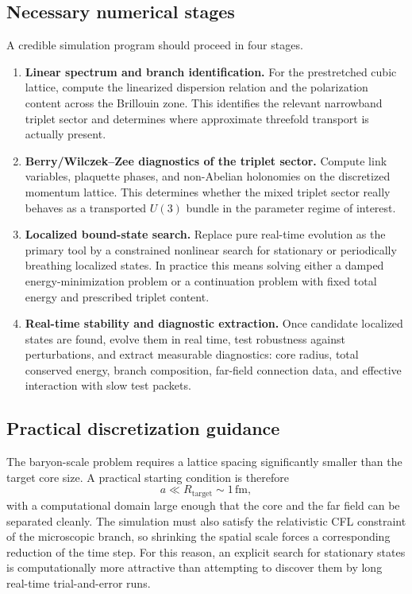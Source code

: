 \subsection{Necessary numerical stages}

A credible simulation program should proceed in four stages.
\begin{enumerate}
\item \textbf{Linear spectrum and branch identification.}
For the prestretched cubic lattice, compute the linearized dispersion relation and the polarization content across the Brillouin zone.
This identifies the relevant narrowband triplet sector and determines where approximate threefold transport is actually present.

\item \textbf{Berry/Wilczek--Zee diagnostics of the triplet sector.}
Compute link variables, plaquette phases, and non-Abelian holonomies on the discretized momentum lattice.
This determines whether the mixed triplet sector really behaves as a transported $U(3)$ bundle in the parameter regime of interest.

\item \textbf{Localized bound-state search.}
Replace pure real-time evolution as the primary tool by a constrained nonlinear search for stationary or periodically breathing localized states.
In practice this means solving either a damped energy-minimization problem or a continuation problem with fixed total energy and prescribed triplet content.

\item \textbf{Real-time stability and diagnostic extraction.}
Once candidate localized states are found, evolve them in real time, test robustness against perturbations, and extract measurable diagnostics:
core radius, total conserved energy, branch composition, far-field connection data, and effective interaction with slow test packets.
\end{enumerate}

\subsection{Practical discretization guidance}

The baryon-scale problem requires a lattice spacing significantly smaller than the target core size.
A practical starting condition is therefore
\begin{equation}
  a \ll R_{\mathrm{target}} \sim 1\,\mathrm{fm},
\end{equation}
with a computational domain large enough that the core and the far field can be separated cleanly.
The simulation must also satisfy the relativistic CFL constraint of the microscopic branch, so shrinking the spatial scale forces a corresponding reduction of the time step.
For this reason, an explicit search for stationary states is computationally more attractive than attempting to discover them by long real-time trial-and-error runs.

